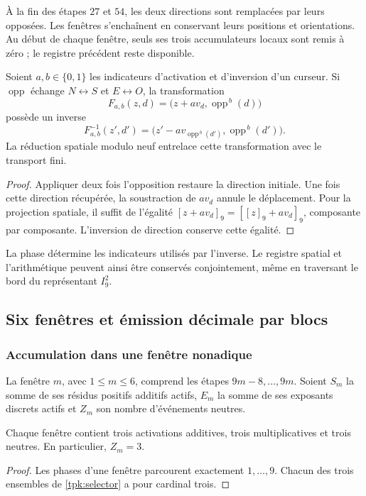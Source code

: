 À la fin des étapes \(27\) et \(54\), les deux directions sont remplacées
par leurs opposées. Les fenêtres s'enchaînent en conservant leurs positions et
orientations. Au début de chaque fenêtre, seuls ses trois accumulateurs locaux sont remis à zéro ; le registre précédent reste disponible.

\begin{proposicion}
\label{tpk:inversion}
Soient \(a,b\in\{0,1\}\) les indicateurs d'activation et d'inversion d'un
curseur. Si \(\operatorname{opp}\) échange \(N\leftrightarrow S\) et
\(E\leftrightarrow O\), la transformation
\[
 F_{a,b}(z,d)=\bigl(z+a v_d,\operatorname{opp}^{\,b}(d)\bigr)
\]
possède un inverse
\[
 F_{a,b}^{-1}(z',d')=
 \bigl(z'-a v_{\operatorname{opp}^{\,b}(d')},
       \operatorname{opp}^{\,b}(d')\bigr).
\]
La réduction spatiale modulo neuf entrelace cette transformation avec le
transport fini.
\end{proposicion}
\begin{proof}
Appliquer deux fois l'opposition restaure la direction initiale. Une fois
cette direction récupérée, la soustraction de \(a v_d\) annule le déplacement.
Pour la projection spatiale, il suffit de l'égalité
\([z+a v_d]_9=[[z]_9+a v_d]_9\), composante par composante. L'inversion de
direction conserve cette égalité.
\end{proof}

La phase détermine les indicateurs utilisés par l'inverse. Le registre
spatial et l'arithmétique peuvent ainsi être conservés conjointement, même en
traversant le bord du représentant \(I_9^2\).

\subsection{Six fenêtres et émission décimale par blocs}
\label{tpk:emision}

\subsubsection{Accumulation dans une fenêtre nonadique}

La fenêtre \(m\), avec \(1\leq m\leq6\), comprend les étapes
\(9m-8,\ldots,9m\). Soient \(S_m\) la somme de ses résidus positifs
additifs actifs, \(E_m\) la somme de ses exposants discrets actifs et
\(Z_m\) son nombre d'événements neutres.

\begin{lema}
\label{tpk:tres-eventos}
Chaque fenêtre contient trois activations additives, trois multiplicatives et
trois neutres. En particulier, \(Z_m=3\).
\end{lema}
\begin{proof}
Les phases d'une fenêtre parcourent exactement \(1,\ldots,9\). Chacun
des trois ensembles de \eqref{tpk:selector} a pour cardinal trois.
\end{proof}

